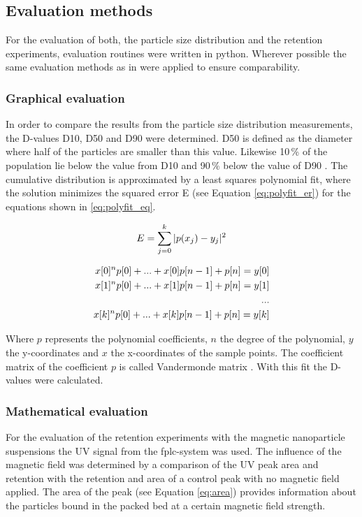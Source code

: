 \subsection{Evaluation methods}
\label{subsec:Eval}
For the evaluation of both, the particle size distribution and the retention experiments, evaluation routines were written in python. Wherever possible the same evaluation methods as in \cite{AndreMaster} were applied to ensure comparability. 

\subsubsection{Graphical evaluation}
\label{subsubsec:Graph_eval}
In order to compare the results from the particle size distribution measurements, the D-values D10, D50 and D90 were determined. D50 is defined as the diameter where half of the particles are smaller than this value. Likewise 10\,\% of the population lie below the value from D10 and 90\,\% below the value of D90 \cite{merkus2009particle}. The cumulative distribution is  approximated by a least squares polynomial fit, where the solution minimizes the squared error E (see Equation \ref{eq:polyfit_er}) for the equations shown in \ref{eq:polyfit_eq}.  

\begin{equation}
\label{eq:polyfit_er}
\centering
E = \sum_{j=0}^{k}\vert p(x_{j})-y_{j}\vert^{2}
\end{equation}

\begin{equation}
\label{eq:polyfit_eq}
\centering
\begin{split}
x[0]^{n}p[0] + ... + x[0]p[n-1] + p[n] = y[0] \\
x[1]^{n}p[0] + ... + x[1]p[n-1] + p[n] = y[1]  \\
... \\ 
x[k]^{n}p[0] + ... + x[k]p[n-1] + p[n] = y[k]
\end{split}
\end{equation}

Where $p$ represents the polynomial coefficients, $n$ the degree of the polynomial, $y$ the y-coordinates and $x$ the x-coordinates of the sample points. The coefficient matrix of the coefficient $p$ is called Vandermonde matrix \cite{bjorck1970solution}. With this fit the D-values were calculated. 

\subsubsection{Mathematical evaluation}
\label{subsubsec:Math_eval}
For the evaluation of the retention experiments with the magnetic nanoparticle suspensions the UV signal from the \gls{fplc}-system was used. The influence of the magnetic field was determined by a comparison of the UV peak area and retention with the retention and area of a control peak with no magnetic field applied. The area of the peak (see Equation \ref{eq:area}) provides information about the particles bound in the packed bed at a certain magnetic field strength.    

